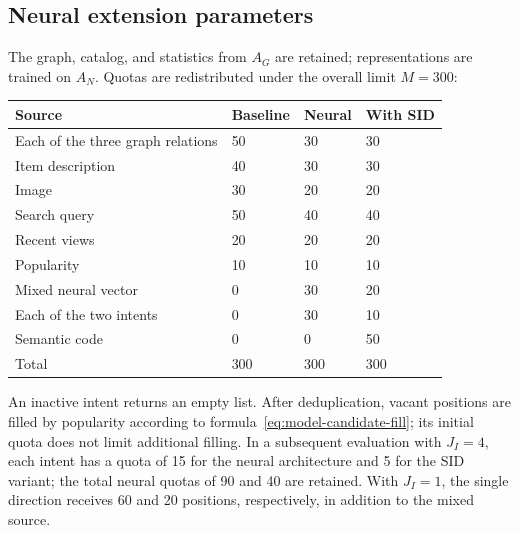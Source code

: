 \documentclass[12pt,a4paper]{article}
\theoremstyle{plainru}
\begin{document}
\subsection{Neural extension parameters}\label{app:neural-config}

The graph, catalog, and statistics from $A_G$ are retained; representations are trained
on $A_N$. Quotas are redistributed under the overall limit $M=300$:
\begin{longtable}{L{0.38\textwidth}L{0.15\textwidth}L{0.15\textwidth}L{0.17\textwidth}}
\toprule Source & Baseline & Neural & With SID \\\midrule\endhead
Each of the three graph relations & 50 & 30 & 30 \\
Item description & 40 & 30 & 30 \\
Image & 30 & 20 & 20 \\
Search query & 50 & 40 & 40 \\
Recent views & 20 & 20 & 20 \\
Popularity & 10 & 10 & 10 \\
Mixed neural vector & 0 & 30 & 20 \\
Each of the two intents & 0 & 30 & 10 \\
Semantic code & 0 & 0 & 50 \\
\midrule Total & 300 & 300 & 300 \\
\bottomrule
\end{longtable}
An inactive intent returns an empty list. After deduplication,
vacant positions are filled by popularity according to
formula~\eqref{eq:model-candidate-fill}; its initial quota
does not limit additional filling.
In a subsequent evaluation with $J_I=4$, each intent has a quota of 15
for the neural architecture and 5 for the SID variant; the total neural
quotas of 90 and 40 are retained. With $J_I=1$, the single direction
receives 60 and 20 positions, respectively, in addition to the mixed source.
\end{document}
